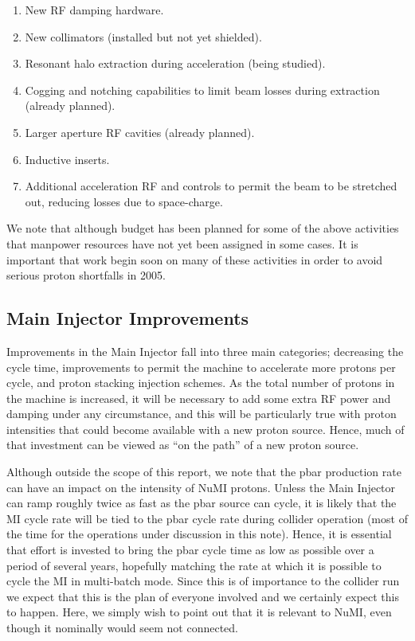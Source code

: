 \documentclass{article}
\begin{document}
\begin {itemize}
\begin {enumerate}
         \item New RF damping hardware.
         \item New collimators  (installed but not yet shielded).
         \item Resonant halo extraction during acceleration (being studied).
         \item Cogging and notching capabilities to limit beam losses during
               extraction (already planned).
         \item Larger aperture RF cavities (already planned).
         \item Inductive inserts.
         \item Additional acceleration RF and controls to permit the beam
               to be stretched out, reducing losses due to space-charge.
         \end {enumerate}
   \end {itemize}
We note that although budget has been planned for some of the above activities
that manpower resources have not yet been assigned in some cases. It is 
important that work begin soon on many of these activities in order to avoid
serious proton shortfalls in 2005.

\subsection {Main Injector Improvements}
\label {sec:MIimprove}

Improvements in the Main Injector fall into three
      main categories; decreasing the cycle time, improvements to permit
      the machine to accelerate more protons per cycle, 
      and proton stacking injection schemes. 
      As the total number of protons in the
      machine is increased, it will be necessary to add some extra RF power and
      damping under any circumstance, and this will be particularly true
      with proton intensities that could become available with a new proton 
      source. Hence, much of that investment can be viewed as ``on the path'' 
      of a new proton source.  

Although outside the scope of this report, we note that the pbar production
rate can have an impact on the intensity of NuMI protons. 
Unless the Main Injector can ramp roughly twice 
as fast as the pbar source can cycle, it is likely that the MI cycle rate
will be tied to the pbar cycle rate during collider operation (most of
the time for the operations under discussion in this note). Hence, it
is essential that effort is invested to bring the pbar cycle time as low
as possible over a period of several years, hopefully matching the rate 
at which it is possible to cycle the MI in multi-batch mode. Since this is
of importance to the collider run we expect that this is the plan of everyone
involved and we certainly expect this to happen. Here, we simply wish to
point out that it is relevant to NuMI, even though it nominally would seem
not connected. 
\end{document}
